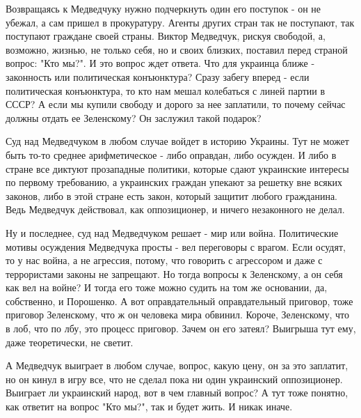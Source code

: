 Возвращаясь к Медведчуку нужно подчеркнуть один его поступок - он не убежал, а
сам пришел в прокуратуру. Агенты других стран так не поступают, так поступают
граждане своей страны. Виктор Медведчук, рискуя свободой, а, возможно, жизнью,
не только себя, но и своих близких, поставил перед страной вопрос: "Кто мы?". И
это вопрос ждет ответа. Что для украинца ближе - законность или политическая
конъюнктура? Сразу забегу вперед - если политическая конъюнктура, то кто нам
мешал колебаться с линей партии в СССР? А если мы купили свободу и дорого за
нее заплатили, то почему сейчас должны отдать ее Зеленскому? Он заслужил такой
подарок? 

Суд над Медведчуком в любом случае войдет в историю Украины. Тут не может быть
то-то среднее арифметическое - либо оправдан, либо осужден. И либо в стране все
диктуют прозападные политики, которые сдают украинские интересы по первому
требованию, а украинских граждан упекают за решетку вне всяких законов, либо в
этой стране есть закон, который защитит любого гражданина. Ведь Медведчук
действовал, как оппозиционер, и ничего незаконного не делал. 

Ну и последнее, суд над Медведчуком решает - мир или война. Политические мотивы
осуждения Медведчука просты - вел переговоры с врагом. Если осудят, то у нас
война, а не агрессия, потому, что говорить с агрессором и даже с террористами
законы не запрещают. Но тогда вопросы к Зеленскому, а он себя как вел на войне?
И тогда его тоже можно судить на том же основании, да, собственно, и Порошенко.
А вот оправдательный оправдательный приговор, тоже приговор Зеленскому, что ж
он человека мира обвинил. Короче, Зеленскому, что в лоб, что по лбу, это
процесс приговор. Зачем он его затеял? Выигрыша тут ему, даже теоретически, не
светит. 

А Медведчук выиграет в любом случае, вопрос, какую цену, он за это заплатит, но
он кинул в игру все, что не сделал пока ни один украинский оппозиционер.
Выиграет ли украинский народ, вот в чем главный вопрос? А тут тоже понятно, как
ответит на вопрос "Кто мы?", так и будет жить. И никак иначе.

